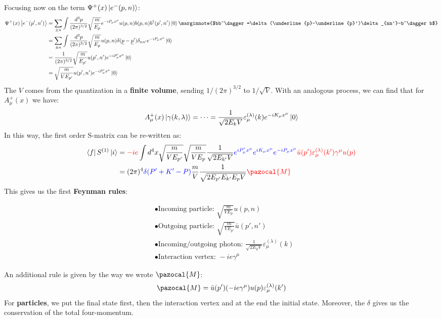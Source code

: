 \documentclass[../main.tex]{subfiles}
\begin{document}
Focusing now on the term $\Psi^+(x)\ket{e^-(p,n)}$:
\begin{align*}
\Psi^+(x)\ket{e^-(p',n')}&=\sum_{\pm n}\int\frac{d^3p}{(2\pi)^{3/2}}\sqrt{\frac{m}{E_p}}e^{-iP_\mu x^\mu}u(p,n)b(p,n)b^\dagger(p',n')\ket{0}\marginnote{$bb^\dagger=\delta(\underline{p}-\underline{p}')\delta_{nn'}-b^\dagger b$}\\
&=\sum_{\pm n}\int\frac{d^3p}{(2\pi)^{3/2}}\sqrt{\frac{m}{E_p}}u(p,n)\delta(\underline{p}-\underline{p}')\delta_{nn'}e^{-iP_\mu x^\mu}\ket{0}\\
&=\frac{1}{(2\pi)^{3/2}}\sqrt{\frac{m}{E_{p'}}}u(p',n')e^{-iP'_\mu x^\mu}\ket{0}\\
&=\sqrt{\frac{m}{VE_{p'}}}u(p',n')e^{-iP'_\mu x^\mu}\ket{0}
\end{align*}
The $V$ comes from the quantization in a \textbf{finite volume}, sending $1/(2\pi)^{3/2}$ to $1/\sqrt{V}$. With an analogous process, we can find that for $A_\mu^+(x)$ we have:
\[
A_\mu^+(x)\ket{\gamma(k,\lambda)}=\dots=\frac{1}{\sqrt{2E_kV}}\varepsilon_\mu^{(\lambda)}(k)e^{-iK_\mu x^\mu}\ket{0}
\]
In this way, the first order S-matrix can be re-written as:
\begin{align*}
\bra{f}S^{(1)}\ket{i}&={\color{red}-ie}\int d^4x\sqrt{\frac{m}{VE_{p'}}}\sqrt{\frac{m}{VE_p}}\frac{1}{\sqrt{2E_{k'}V}}{\color{blue}e^{iP'_\mu x^\mu}e^{iK_\mu x^\mu}e^{-iP_\mu x^\mu}}{\color{red}\bar{u}(p')\varepsilon_\mu^{(\lambda)}(k')\gamma^\mu u(p)}\\
&=(2\pi)^4{\color{blue}\delta(P'+K'-P)}\frac{m}{V}\frac{1}{\sqrt{2E_{p'}E_{k'}E_pV}}{\color{red}\pazocal{M}}
\end{align*}
This gives us the first \textbf{Feynman rules}:
\begin{kaobox}[frametitle=Feynman rules]
\[
\begin{aligned}
&\bullet\text{Incoming particle: } \sqrt{\frac{m}{VE_p}}u(p,n)\\
&\bullet\text{Outgoing particle: } \sqrt{\frac{m}{VE_{p'}}}\bar{u}(p',n')\\
&\bullet\text{Incoming/outgoing photon: } \frac{1}{\sqrt{2E_kV}}\varepsilon_\mu^{(\lambda)}(k)\\
&\bullet\text{Interaction vertex: } -ie\gamma^\mu
\end{aligned}
\]
\end{kaobox}
An additional rule is given by the way we wrote $\pazocal{M}$:
\[
\pazocal{M}=\bar{u}(p')(-ie\gamma^\mu)u(p)\varepsilon^{(\lambda)}_\mu(k')
\]
For \textbf{particles}, we put the final state first, then the interaction vertex and at the end the initial state. Moreover, the $\delta$ gives us the conservation of the total four-momentum. 
\end{document}
